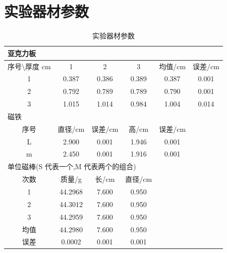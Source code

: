 \documentclass[AutoFakeBold]{LZUThesis}
\begin{document}
\Appendix
\section{实验器材参数}
\label{参数}
\begin{table}[H]
    \centering

    \caption{实验器材参数}
    \begin{tabular}{cccccc} %
        \toprule
        \multicolumn{6}{l}{亚克力板}      \\
        \midrule             
        序号\textbackslash{}厚度 cm & 1       & 2     & 3     & 均值/cm & 误差/cm \\
        1                       & 0.387   & 0.386 & 0.389 & 0.387 & 0.001 \\
        2                       & 0.792   & 0.789 & 0.789 & 0.790 & 0.001 \\
        3                       & 1.015   & 1.014 & 0.984 & 1.004 & 0.014 \\
        \toprule
        \multicolumn{6}{l}{磁铁}     \\
        \midrule                                      
        序号                      & 直径/cm   & 误差/cm & 高/cm  & 误差/cm &       \\
        L                       & 2.900   & 0.001 & 1.946 & 0.001 &       \\
        m                       & 2.450   & 0.001 & 1.916 & 0.001 &       \\
        \toprule
        \multicolumn{6}{l}{单位磁棒(S 代表一个,M 代表两个的组合)}   \\
        \midrule                     
        次数                      & 质量/g    & 长/cm  & 直径/cm &       &       \\
        1                       & 44.2968 & 7.600 & 0.950 &       &       \\
        2                       & 44.3012 & 7.600 & 0.950 &       &       \\
        3                       & 44.2959 & 7.600 & 0.950 &       &       \\
        均值                      & 44.2980 & 7.600 & 0.950 &       &       \\
        误差                      & 0.0002  & 0.001 & 0.001 &       &      \\
        \bottomrule
    \end{tabular}
    \label{实验器材参数}
\end{table}
\end{document}
